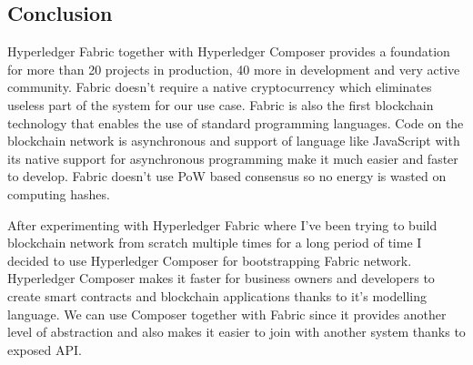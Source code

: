 \subsection{Conclusion}

Hyperledger Fabric together with Hyperledger Composer provides a foundation for more than 20 projects in production, 40 more in development \cite{showcase} and very active community. Fabric doesn't require a native cryptocurrency which eliminates useless part of the system for our use case. Fabric is also the first blockchain technology that enables the use of standard programming languages. Code on the blockchain network is asynchronous and support of language like JavaScript with its native support for asynchronous programming make it much easier and faster to develop. Fabric doesn't use PoW based consensus so no energy is wasted on computing hashes.

After experimenting with Hyperledger Fabric where I've been trying to build blockchain network from scratch multiple times for a long period of time I decided to use Hyperledger Composer for bootstrapping Fabric network. 
Hyperledger Composer makes it faster for business owners and developers to create smart contracts and blockchain applications thanks to it's modelling language. We can use Composer together with Fabric since it provides another level of abstraction and also makes it easier to join with another system thanks to exposed API.


\newpage